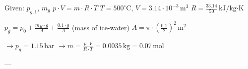 Given: \( p_{g,1} \), \( m_g \)  
\( p \cdot V = m \cdot R \cdot T \)  
\( T = 500^\circ \text{C} \), \( V = 3.14 \cdot 10^{-3} \, \text{m}^3 \)  
\( R = \frac{33.14}{50} \, \text{kJ/kg·K} \)  

\( p_g = p_0 + \frac{m_K \cdot g}{A} + \frac{0.1 \cdot g}{A} \) (mass of ice-water)  
\( A = \pi \cdot \left( \frac{0.1}{2} \right)^2 \, \text{m}^2 \)  

\( \rightarrow p_g = 1.15 \, \text{bar} \)  
\( \rightarrow m = \frac{p \cdot V}{R \cdot T} = 0.0035 \, \text{kg} = 0.07 \, \text{mol} \)  

---